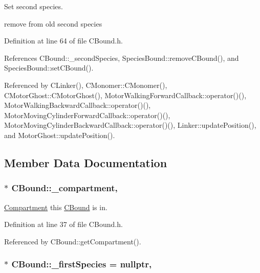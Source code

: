 Set second species. 

remove from old second species 

Definition at line 64 of file C\+Bound.\+h.



References C\+Bound\+::\+\_\+second\+Species, Species\+Bound\+::remove\+C\+Bound(), and Species\+Bound\+::set\+C\+Bound().



Referenced by C\+Linker(), C\+Monomer\+::\+C\+Monomer(), C\+Motor\+Ghost\+::\+C\+Motor\+Ghost(), Motor\+Walking\+Forward\+Callback\+::operator()(), Motor\+Walking\+Backward\+Callback\+::operator()(), Motor\+Moving\+Cylinder\+Forward\+Callback\+::operator()(), Motor\+Moving\+Cylinder\+Backward\+Callback\+::operator()(), Linker\+::update\+Position(), and Motor\+Ghost\+::update\+Position().



\subsection{Member Data Documentation}
\hypertarget{classCBound_a95a66719b898cf32e60ae7137186bbbf}{
\subsubsection[{\+\_\+compartment}]{$\ast$ C\+Bound\+::\+\_\+compartment\hspace{0.3cm}{\ttfamily [protected]}, {\ttfamily [inherited]}}}\label{classCBound_a95a66719b898cf32e60ae7137186bbbf}


\hyperlink{classCompartment}{Compartment} this \hyperlink{classCBound}{C\+Bound} is in. 



Definition at line 37 of file C\+Bound.\+h.



Referenced by C\+Bound\+::get\+Compartment().

\hypertarget{classCBound_a7ee4f44fd39c414be1f7b74b1031c1ce}{
\subsubsection[{\+\_\+first\+Species}]{$\ast$ C\+Bound\+::\+\_\+first\+Species = nullptr\hspace{0.3cm}{\ttfamily [protected]}, {\ttfamily [inherited]}}}\label{classCBound_a7ee4f44fd39c414be1f7b74b1031c1ce}


